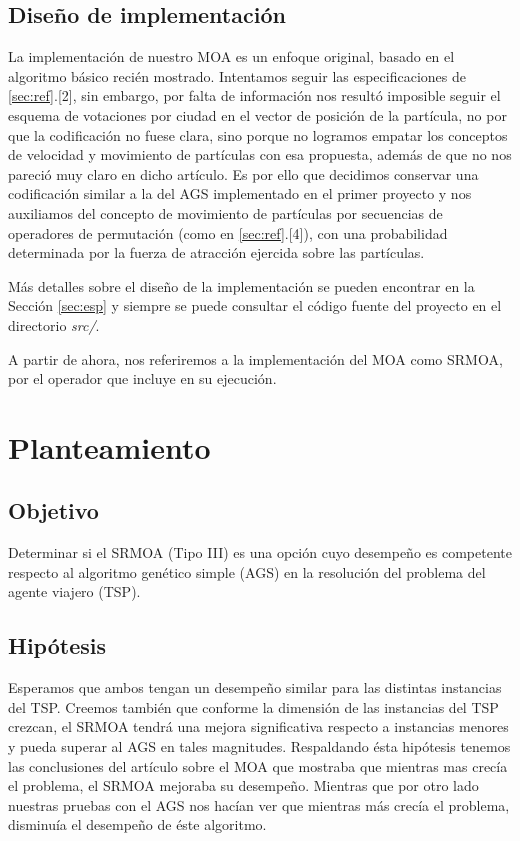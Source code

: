 \documentclass[12pt]{article}
\begin{document}
\subsection*{Diseño de implementación}
La implementación de nuestro MOA es un enfoque original, basado en el algoritmo básico recién mostrado. Intentamos seguir las especificaciones de
\ref{sec:ref}.[2], sin embargo, por falta de información nos resultó imposible seguir el esquema de votaciones por ciudad en el vector de posición de la partícula, no por que la codificación no fuese clara, sino porque no logramos empatar los conceptos de velocidad y movimiento de partículas con esa propuesta, además de que no nos pareció muy claro en dicho artículo. Es por ello que decidimos conservar una codificación similar a la del AGS implementado en el primer proyecto y nos auxiliamos del concepto de movimiento de partículas por secuencias de operadores de permutación (como en \ref{sec:ref}.[4]), con una probabilidad determinada por la fuerza de atracción ejercida sobre las partículas.

Más detalles sobre el diseño de la implementación se pueden encontrar en la Sección \ref{sec:esp} y siempre se puede consultar el código fuente
del proyecto en el directorio \textit{src/}.

A partir de ahora, nos referiremos a la implementación del MOA como SRMOA, por el operador que incluye en su ejecución.
\newpage
\section{Planteamiento}
\subsection*{Objetivo}
Determinar si el SRMOA (Tipo III) es una opción cuyo desempeño es competente respecto al algoritmo genético simple (AGS) en la resolución del problema del agente viajero (TSP).
\subsection*{Hipótesis}
 Esperamos que ambos tengan un desempeño similar para las distintas instancias del TSP. Creemos también que conforme la dimensión de las instancias del TSP crezcan, el SRMOA tendrá una mejora significativa respecto a instancias menores y pueda superar al AGS en tales magnitudes.  Respaldando ésta hipótesis tenemos las conclusiones del artículo sobre el MOA que mostraba que mientras mas crecía el problema, el SRMOA mejoraba su desempeño. Mientras que por otro lado nuestras pruebas con el AGS nos hacían ver que mientras más crecía el problema, disminuía el desempeño de éste algoritmo.
\end{document}
